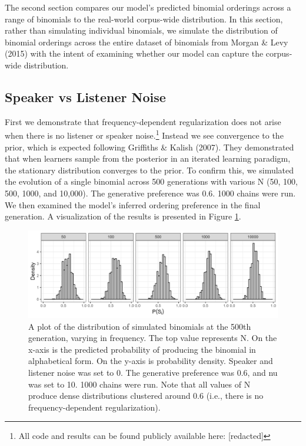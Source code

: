 \documentclass[10pt, letterpaper]{article}
\newenvironment{CodeChunk}{}{}
\begin{document}
The second section compares our model's predicted binomial orderings
across a range of binomials to the real-world corpus-wide distribution.
In this section, rather than simulating individual binomials, we
simulate the distribution of binomial orderings across the entire
dataset of binomials from Morgan \& Levy (2015) with the intent of
examining whether our model can capture the corpus-wide distribution.

\hypertarget{speaker-vs-listener-noise}{%
\subsection{Speaker vs Listener Noise}\label{speaker-vs-listener-noise}}

First we demonstrate that frequency-dependent regularization does not
arise when there is no listener or speaker noise.\footnote{All code and
  results can be found publicly available here: {[}redacted{]}} Instead
we see convergence to the prior, which is expected following Griffiths
\& Kalish (2007). They demonstrated that when learners sample from the
posterior in an iterated learning paradigm, the stationary distribution
converges to the prior. To confirm this, we simulated the evolution of a
single binomial across 500 generations with various N (50, 100, 500,
1000, and 10,000). The generative preference was 0.6. 1000 chains were
run. We then examined the model's inferred ordering preference in the
final generation. A visualization of the results is presented in Figure
\ref{fig:noNoisePlot}.

\begin{CodeChunk}
\begin{figure}[tb]

{\centering \includegraphics[width=1\linewidth]{Figures/noNoise} 

}

\caption[A plot of the distribution of simulated binomials at the 500th generation, varying in frequency]{A plot of the distribution of simulated binomials at the 500th generation, varying in frequency. The top value represents N. On the x-axis is the predicted probability of producing the binomial in alphabetical form. On the y-axis is probability density. Speaker and listener noise was set to 0. The generative preference was 0.6, and nu was set to 10. 1000 chains were run. Note that all values of N produce dense distributions clustered around 0.6 (i.e., there is no frequency-dependent regularization).}\label{fig:noNoisePlot}
\end{figure}
\end{CodeChunk}
\end{document}
